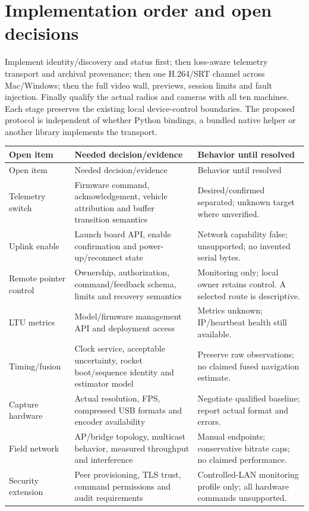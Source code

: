 \section{Implementation order and open decisions}
Implement identity/discovery and status first; then loss-aware telemetry transport
and archival provenance; then one H.264/SRT channel across Mac/Windows; then the
full video wall, previews, session limits and fault injection. Finally qualify
the actual radios and cameras with all ten machines. Each stage preserves the
existing local device-control boundaries. The proposed protocol is independent
of whether Python bindings, a bundled native helper or another library implements
the transport.

\begin{longtable}{L{29mm}L{78mm}L{54mm}}
\toprule Open item & Needed decision/evidence & Behavior until resolved\\\midrule
\endfirsthead
\toprule Open item & Needed decision/evidence & Behavior until resolved\\\midrule
\endhead
Telemetry switch & Firmware command, acknowledgement, vehicle attribution and buffer transition semantics & Desired/confirmed separated; unknown target where unverified.\\
Uplink enable & Launch board API, enable confirmation and power-up/reconnect state & Network capability false; unsupported; no invented serial bytes.\\
Remote pointer control & Ownership, authorization, command/feedback schema, limits and recovery semantics & Monitoring only; local owner retains control. A selected route is descriptive.\\
LTU metrics & Model/firmware management API and deployment access & Metrics unknown; IP/heartbeat health still available.\\
Timing/fusion & Clock service, acceptable uncertainty, rocket boot/sequence identity and estimator model & Preserve raw observations; no claimed fused navigation estimate.\\
Capture hardware & Actual resolution, FPS, compressed USB formats and encoder availability & Negotiate qualified baseline; report actual format and errors.\\
Field network & AP/bridge topology, multicast behavior, measured throughput and interference & Manual endpoints; conservative bitrate caps; no claimed performance.\\
Security extension & Peer provisioning, TLS trust, command permissions and audit requirements & Controlled-LAN monitoring profile only; all hardware commands unsupported.\\
\bottomrule
\end{longtable}

